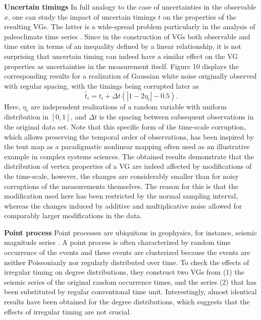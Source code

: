 		
		{\bf{Uncertain timings}} 
		In full analogy to the case of uncertainties in the observable $x$, one can study the impact of uncertain timings $t$ on the properties of the resulting VGs. The latter is a wide-spread problem particularly in the analysis of paleoclimate time series \cite{Telford2004}. Since in the construction of VGs both observable and time enter in terms of an inequality defined by a linear relationship, it is not surprising that uncertain timing can indeed have a similar effect on the VG properties as uncertainties in the measurement itself. Figure 10 displays the corresponding results for a realization of Gaussian white noise originally observed with regular spacing, with the timings being corrupted later as
		\begin{equation}
		\tilde{t_i} = t_i + \Delta t (| 1 - 2\eta_i | - 0.5).
		\end{equation}		
		Here,  $\eta_i$ are independent realizations of a random variable with uniform distribution in $[0,1]$, and $\Delta t$ is the spacing between subsequent observations in the original data set. Note that this specific form of the time-scale corruption, which allows preserving the temporal order of observations, has been inspired by the tent map as a paradigmatic nonlinear mapping often used as an illustrative example in complex systems sciences. The obtained results demonstrate that the distribution of vertex properties of a VG are indeed affected by modifications of the time-scale, however, the changes are considerably smaller than for noisy corruptions of the measurements themselves. The reason for this is that the modification used here has been restricted by the normal sampling interval, whereas the changes induced by additive and multiplicative noise allowed for comparably larger modifications in the data.
			
		{\bf{Point process}}
		Point processes are ubiquitous in geophysics, for instance, seismic magnitude series \cite{Telesca2012}. A point process is often characterized by random time occurrence of the events and these events are clusterized because the events are neither Poissonianly nor regularly distributed over time. To check the effects of irregular timing on degree distributions, they construct two VGs from (1) the seismic series of the original random occurrence times, and the series (2) that has been substituted by regular conventional time unit. Interestingly, almost identical results have been obtained for the degree distributions, which suggests that the effects of irregular timing are not crucial. 

